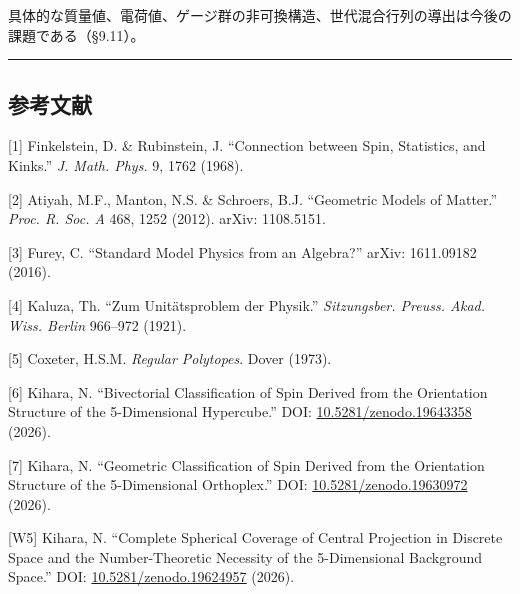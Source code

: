 \documentclass[
  a4paper,11pt]{ltjsarticle}
\theoremstyle{definition}
\theoremstyle{remark}
\begin{document}
具体的な質量値、電荷値、ゲージ群の非可換構造、世代混合行列の導出は今後の課題である（§9.11）。

\begin{center}\rule{0.5\linewidth}{0.5pt}\end{center}

\subsection{参考文献}\label{ux53c2ux8003ux6587ux732e}

{[}1{]} Finkelstein, D. \& Rubinstein, J. ``Connection between Spin,
Statistics, and Kinks.'' \emph{J. Math. Phys.} 9, 1762 (1968).

{[}2{]} Atiyah, M.F., Manton, N.S. \& Schroers, B.J. ``Geometric Models
of Matter.'' \emph{Proc. R. Soc. A} 468, 1252 (2012). arXiv: 1108.5151.

{[}3{]} Furey, C. ``Standard Model Physics from an Algebra?'' arXiv:
1611.09182 (2016).

{[}4{]} Kaluza, Th. ``Zum Unitätsproblem der Physik.''
\emph{Sitzungsber. Preuss. Akad. Wiss. Berlin} 966--972 (1921).

{[}5{]} Coxeter, H.S.M. \emph{Regular Polytopes}. Dover (1973).

{[}6{]} Kihara, N. ``Bivectorial Classification of Spin Derived from the
Orientation Structure of the 5-Dimensional Hypercube.'' DOI:
\href{https://doi.org/10.5281/zenodo.19643358}{10.5281/zenodo.19643358}
(2026).

{[}7{]} Kihara, N. ``Geometric Classification of Spin Derived from the
Orientation Structure of the 5-Dimensional Orthoplex.'' DOI:
\href{https://doi.org/10.5281/zenodo.19630972}{10.5281/zenodo.19630972}
(2026).

{[}W5{]} Kihara, N. ``Complete Spherical Coverage of Central Projection
in Discrete Space and the Number-Theoretic Necessity of the
5-Dimensional Background Space.'' DOI:
\href{https://doi.org/10.5281/zenodo.19624957}{10.5281/zenodo.19624957}
(2026).
\end{document}
